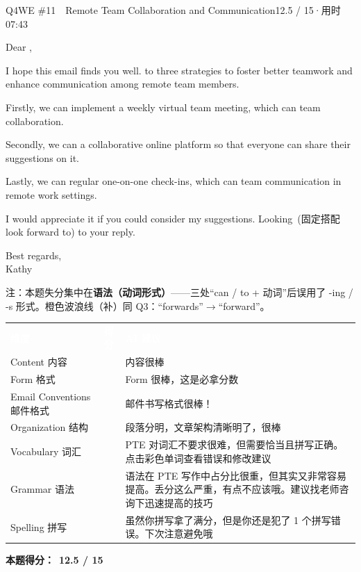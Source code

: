 \begin{qblock}{Q4\quad WE \#11\ \ Remote Team Collaboration and Communication}{12.5 / 15\quad·\quad 用时 07:43}
\begin{youbox}
Dear ,

I hope this email finds you well.  to  three strategies to foster better teamwork and enhance communication among remote team members.

Firstly, we can implement a weekly virtual team meeting, which can  team collaboration.

Secondly, we can  a collaborative online platform so that everyone can share their suggestions on it.

Lastly, we can  regular one-on-one check-ins, which can  team communication in remote work settings.

I would appreciate it if you could consider my suggestions. Looking \,(固定搭配 look forward to) to your reply.

Best regards,\\ Kathy
\end{youbox}
{\footnotesize\color{gray} 注：本题失分集中在\textbf{语法（动词形式）}——三处“can / to + 动词”后误用了 -ing / -s 形式。橙色波浪线（补）同 Q3：``forwards''$\to$``forward''。}

{\small\scorehead
\begin{tabularx}{\linewidth}{l c Y}
\textcolor{white}{\bfseries 维度} & \textcolor{white}{\bfseries 得分} & \textcolor{white}{\bfseries AI 建议}\\
Content 内容              &  & 内容很棒\\
Form 格式                &  & Form 很棒，这是必拿分数\\
Email Conventions 邮件格式 &  & 邮件书写格式很棒！\\
Organization 结构         &  & 段落分明，文章架构清晰明了，很棒\\
Vocabulary 词汇           &  & PTE 对词汇不要求很难，但需要恰当且拼写正确。点击彩色单词查看错误和修改建议\\
Grammar 语法              &    & 语法在 PTE 写作中占分比很重，但其实又非常容易提高。丢分这么严重，有点不应该哦。建议找老师咨询下迅速提高的技巧\\
Spelling 拼写             &  & 虽然你拼写拿了满分，但是你还是犯了 1 个拼写错误。下次注意避免哦\\
\end{tabularx}}
\smallskip
\textbf{本题得分：}\ {\color{cAccent}\bfseries 12.5 / 15}

\end{qblock}
